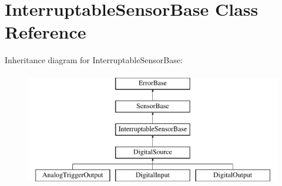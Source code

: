 \hypertarget{classInterruptableSensorBase}{\section{\-Interruptable\-Sensor\-Base \-Class \-Reference}
\label{classInterruptableSensorBase}
}
\-Inheritance diagram for \-Interruptable\-Sensor\-Base\-:\begin{figure}[H]
\begin{center}
\leavevmode
\includegraphics[height=5.000000cm]{classInterruptableSensorBase}
\end{center}
\end{figure}
